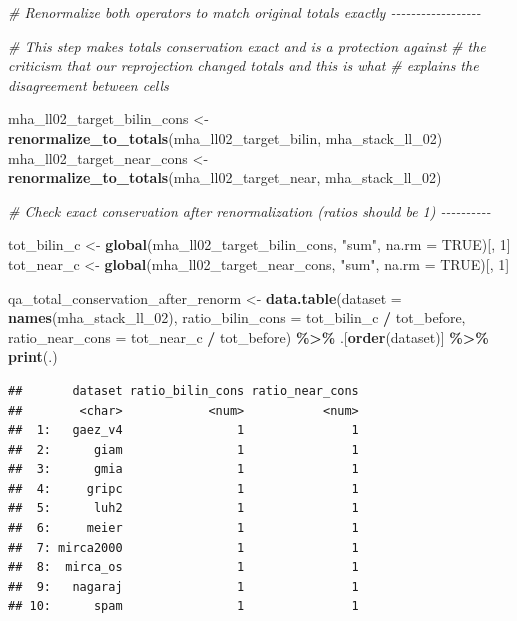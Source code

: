 \documentclass[
  11pt,
]{article}
\newenvironment{Shaded}{\begin{snugshade}}{\end{snugshade}}
\newcommand{\AttributeTok}[1]{\textcolor[rgb]{0.13,0.29,0.53}{#1}}
\newcommand{\CommentTok}[1]{\textcolor[rgb]{0.56,0.35,0.01}{\textit{#1}}}
\newcommand{\ConstantTok}[1]{\textcolor[rgb]{0.56,0.35,0.01}{#1}}
\newcommand{\DecValTok}[1]{\textcolor[rgb]{0.00,0.00,0.81}{#1}}
\newcommand{\FunctionTok}[1]{\textcolor[rgb]{0.13,0.29,0.53}{\textbf{#1}}}
\newcommand{\NormalTok}[1]{#1}
\newcommand{\OtherTok}[1]{\textcolor[rgb]{0.56,0.35,0.01}{#1}}
\newcommand{\SpecialCharTok}[1]{\textcolor[rgb]{0.81,0.36,0.00}{\textbf{#1}}}
\newcommand{\StringTok}[1]{\textcolor[rgb]{0.31,0.60,0.02}{#1}}
\begin{document}
\begin{Shaded}
\begin{Highlighting}[]
\CommentTok{\# Renormalize both operators to match original totals exactly {-}{-}{-}{-}{-}{-}{-}{-}{-}{-}{-}{-}{-}{-}{-}{-}{-}{-}}

\CommentTok{\# This step makes totals conservation exact and is a protection against}
\CommentTok{\# the criticism that our reprojection changed totals and this is what}
\CommentTok{\# explains the disagreement between cells}

\NormalTok{mha\_ll02\_target\_bilin\_cons }\OtherTok{\textless{}{-}} \FunctionTok{renormalize\_to\_totals}\NormalTok{(mha\_ll02\_target\_bilin, mha\_stack\_ll\_02)}
\NormalTok{mha\_ll02\_target\_near\_cons  }\OtherTok{\textless{}{-}} \FunctionTok{renormalize\_to\_totals}\NormalTok{(mha\_ll02\_target\_near,  mha\_stack\_ll\_02)}

\CommentTok{\# Check exact conservation after renormalization (ratios should be 1) {-}{-}{-}{-}{-}{-}{-}{-}{-}{-}}

\NormalTok{tot\_bilin\_c }\OtherTok{\textless{}{-}} \FunctionTok{global}\NormalTok{(mha\_ll02\_target\_bilin\_cons, }\StringTok{"sum"}\NormalTok{, }\AttributeTok{na.rm =} \ConstantTok{TRUE}\NormalTok{)[, }\DecValTok{1}\NormalTok{]}
\NormalTok{tot\_near\_c  }\OtherTok{\textless{}{-}} \FunctionTok{global}\NormalTok{(mha\_ll02\_target\_near\_cons,  }\StringTok{"sum"}\NormalTok{, }\AttributeTok{na.rm =} \ConstantTok{TRUE}\NormalTok{)[, }\DecValTok{1}\NormalTok{]}

\NormalTok{qa\_total\_conservation\_after\_renorm }\OtherTok{\textless{}{-}} \FunctionTok{data.table}\NormalTok{(}\AttributeTok{dataset =} \FunctionTok{names}\NormalTok{(mha\_stack\_ll\_02),}
           \AttributeTok{ratio\_bilin\_cons =}\NormalTok{ tot\_bilin\_c }\SpecialCharTok{/}\NormalTok{ tot\_before,}
           \AttributeTok{ratio\_near\_cons  =}\NormalTok{ tot\_near\_c  }\SpecialCharTok{/}\NormalTok{ tot\_before) }\SpecialCharTok{\%\textgreater{}\%}
\NormalTok{        .[}\FunctionTok{order}\NormalTok{(dataset)] }\SpecialCharTok{\%\textgreater{}\%}
  \FunctionTok{print}\NormalTok{(.)}
\end{Highlighting}
\end{Shaded}

\begin{verbatim}
##       dataset ratio_bilin_cons ratio_near_cons
##        <char>            <num>           <num>
##  1:   gaez_v4                1               1
##  2:      giam                1               1
##  3:      gmia                1               1
##  4:     gripc                1               1
##  5:      luh2                1               1
##  6:     meier                1               1
##  7: mirca2000                1               1
##  8:  mirca_os                1               1
##  9:   nagaraj                1               1
## 10:      spam                1               1
\end{verbatim}
\end{document}
